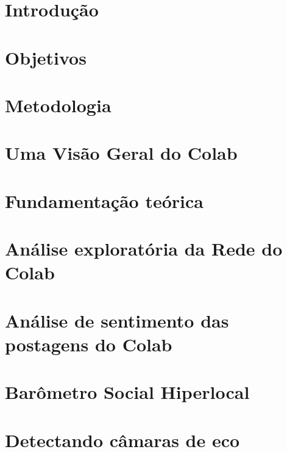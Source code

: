 \documentclass[mestrado, pre-defesa]{packages/icmc}
\begin{document}
\textual

\chapter{Introdução}
\label{chapter:01_introducao}


\chapter{Objetivos}
\label{chapter:02_objetivos}


\chapter{Metodologia}
\label{chapter:03_metodologia}


\chapter{Uma Visão Geral do Colab}
\label{chapter:04_colab}


\chapter{Fundamentação teórica}
\label{chapter:05_networkanalysis}


\chapter{Análise exploratória da Rede do Colab}
\label{chapter:06_exploratory}


\chapter{Análise de sentimento das postagens do Colab}
\label{chapter:07_sentiment}


\chapter{Barômetro Social Hiperlocal}
\label{chapter:08_hyperlocalbarometer}


\chapter{Detectando câmaras de eco}
\label{chapter:08_echochamberdetection}

\end{document}
